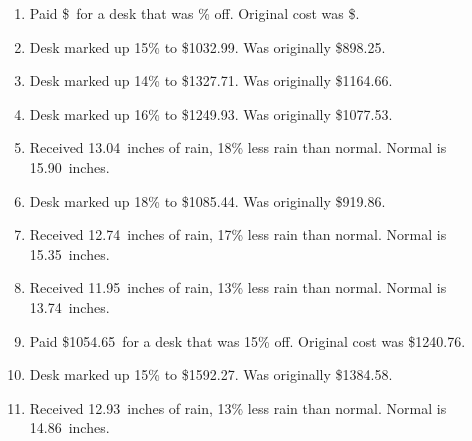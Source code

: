 \documentclass[12pt]{amsart}
\begin{document}
\begin{enumerate}
\item Paid \$\paid\ for a desk that was \discount\% off. Original cost was \$\orcost. 
\def \discount{15}\def \paid{1032.99}\def \rainy{9.90}\def \orcost{1215.28}\def \purcost{898.25}\def \orrainy{11.65}
\item Desk marked up \discount\% to \$\paid. Was originally \$\purcost. 
\def \discount{14}\def \paid{1327.71}\def \rainy{15.08}\def \orcost{1543.85}\def \purcost{1164.66}\def \orrainy{17.53}
\item Desk marked up \discount\% to \$\paid. Was originally \$\purcost. 
\def \discount{16}\def \paid{1249.93}\def \rainy{12.89}\def \orcost{1488.01}\def \purcost{1077.53}\def \orrainy{15.35}
\item Desk marked up \discount\% to \$\paid. Was originally \$\purcost. 
\def \discount{18}\def \paid{1675.06}\def \rainy{13.04}\def \orcost{2042.76}\def \purcost{1419.54}\def \orrainy{15.90}
\item Received \rainy\ inches of rain, \discount\% less rain than normal. Normal is \orrainy\ inches.
\def \discount{18}\def \paid{1085.44}\def \rainy{13.92}\def \orcost{1323.71}\def \purcost{919.86}\def \orrainy{16.98}
\item Desk marked up \discount\% to \$\paid. Was originally \$\purcost. 
\def \discount{17}\def \paid{1408.47}\def \rainy{12.74}\def \orcost{1696.95}\def \purcost{1203.82}\def \orrainy{15.35}
\item Received \rainy\ inches of rain, \discount\% less rain than normal. Normal is \orrainy\ inches.
\def \discount{13}\def \paid{1149.37}\def \rainy{11.95}\def \orcost{1321.11}\def \purcost{1017.14}\def \orrainy{13.74}
\item Received \rainy\ inches of rain, \discount\% less rain than normal. Normal is \orrainy\ inches.
\def \discount{15}\def \paid{1054.65}\def \rainy{10.31}\def \orcost{1240.76}\def \purcost{917.09}\def \orrainy{12.13}
\item Paid \$\paid\ for a desk that was \discount\% off. Original cost was \$\orcost. 
\def \discount{15}\def \paid{1592.27}\def \rainy{15.17}\def \orcost{1873.26}\def \purcost{1384.58}\def \orrainy{17.85}
\item Desk marked up \discount\% to \$\paid. Was originally \$\purcost. 
\def \discount{13}\def \paid{1984.88}\def \rainy{12.93}\def \orcost{2281.47}\def \purcost{1756.53}\def \orrainy{14.86}
\item Received \rainy\ inches of rain, \discount\% less rain than normal. Normal is \orrainy\ inches.
\def \discount{17}\def \paid{1402.40}\def \rainy{13.66}\def \orcost{1689.64}\def \purcost{1198.63}\def \orrainy{16.46}

\end{enumerate}
\end{document}
